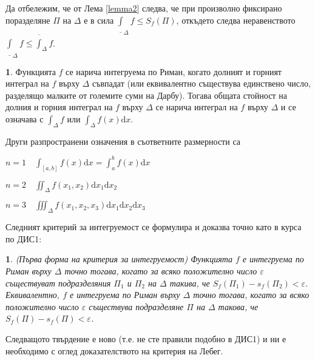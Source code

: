 \documentclass[11pt]{article}
\numberwithin{equation}{section}
\numberwithin{figure}{section}
\numberwithin{table}{section}
\theoremstyle{plain}
\theoremstyle{definition}
\newtheorem{defn}[thm]{\protect\definitionname}
\theoremstyle{remark}
\theoremstyle{definition}
\theoremstyle{remark}
\theoremstyle{plain}
\theoremstyle{definition}
\theoremstyle{definition}
\theoremstyle{plain}
\theoremstyle{plain}
\newtheorem{prop}[thm]{\protect\propositionname}
\theoremstyle{plain}
\theoremstyle{definition}
\theoremstyle{plain}
\providecommand{\definitionname}{Дефиниция}
\providecommand{\propositionname}{Твърдение}
\begin{document}
Да отбележим, че от Лема \ref{lemma2} следва, че при произволно фиксирано поразделяне $\Pi$ на $\Delta$ е в сила $\underline{\int}_\Delta f \le S_f(\Pi)$, откъдето следва неравенството $\underline{\int}_\Delta f \le \overline{\int}_\Delta f$.
\begin{defn} Функцията
$f$ се нарича интегруема по Риман, когато долният и горният интеграл на $f$ върху $\Delta$ съвпадат (или еквивалентно съществува единствено число, разделящо малките от големите суми на Дарбу). Тогава общата стойност на долния и горния интеграл на $f$ върху $\Delta$ се нарича интеграл на $f$ върху $\Delta$ и се означава с $\int_\Delta f$ или $\int_\Delta f(x) \textrm{d}x$.
\end{defn}
Други разпространени означения в съответните размерности са

$n=1 \quad \int_{[a,b]} f(x) \textrm{d}x = \int_{a}^b f(x) \textrm{d}x$

$n=2 \quad \iint_{\Delta} f(x_1, x_2) \textrm{d}x_1 \textrm{d}x_2$

$n=3 \quad \iiint_{\Delta} f(x_1, x_2, x_3) \textrm{d}x_1 \textrm{d}x_2 \textrm{d}x_3$

\bigskip

Следният критерий за интегруемост се формулира и доказва точно като в курса по ДИС1:

\begin{prop} (Първа форма на критерия за интегруемост) Функцията $f$ е интегруема по Риман върху $\Delta$ точно тогава, когато за всяко положително число $\varepsilon$ съществуват подразделяния $\Pi_1$ и $\Pi_2$ на $\Delta$ такива, че $S_f(\Pi_1)-s_f(\Pi_2)<\varepsilon$. Еквивалентно, $f$ е интегруема по Риман върху $\Delta$ точно тогава, когато за всяко положително число $\varepsilon$ съществува подразделяне $\Pi$ на $\Delta$ такова, че $S_f(\Pi)-s_f(\Pi)<\varepsilon$.
\end{prop}

Следващото твърдение е ново (т.е. не сте правили подобно в ДИС1) и ни е необходимо с оглед доказателството на критерия на Лебег.
\end{document}
